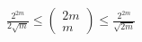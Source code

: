 $\frac{2^{2m}}{2 \sqrt{m}} \leq 
\left( \begin{array}{c}
	2m\\
	m
\end{array} \right)  \leq \frac{2^{2m}}{\sqrt{2m}}$